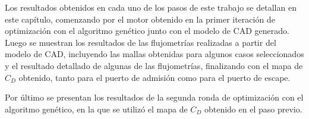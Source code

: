 Los resultados obtenidos en cada uno de los pasos de este trabajo se detallan en
este capítulo, comenzando por el motor obtenido en la primer iteración de
optimización con el algoritmo genético junto con el modelo de CAD generado.
%
Luego se muestran los resultados de las flujometrías realizadas a partir del
modelo de CAD, incluyendo las mallas obtenidas para algunos casos seleccionados
y el resultado detallado de algunas de las flujometrías, finalizando con el mapa
de $C_{D}$ obtenido, tanto para el puerto de admisión como para
el puerto de escape.

Por último se presentan los resultados de la segunda ronda de optimización con
el algoritmo genético, en la que se utilizó el mapa de $C_{D}$ obtenido en el
paso previo.
%







